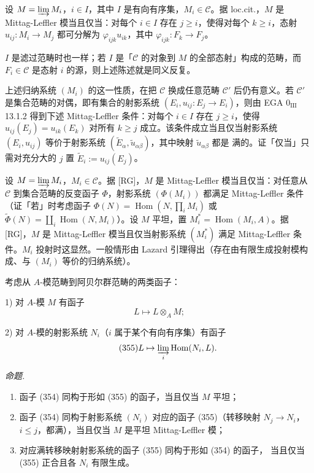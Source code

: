  设 $M=\varinjlim M_i$，$i\in I$，其中 $I$ 是有向有序集，$M_i\in\mathcal{C}$。据 loc.cit.，$M$ 是 Mittag-Leffler 模当且仅当：对每个 $i\in I$ 存在 $j\ge i$，使得对每个 $k\ge i$，态射 $u_{ij}:M_i\to M_j$ 都可分解为 $\varphi_{ijk}u_{ik}$，其中 $\varphi_{ijk}:F_k\to F_j$。

$I$ 是滤过范畴时也一样；若 $I$ 是「$\mathcal{C}$ 的对象到 $M$ 的全部态射」构成的范畴，而 $F_i\in\mathcal{C}$ 是态射 $i$ 的源，则上述陈述就是同义反复。

 上述归纳系统 $(M_i)$ 的这一性质，在把 $\mathcal{C}$ 换成任意范畴 $\mathcal{C}'$ 后仍有意义。若 $\mathcal{C}'$ 是集合范畴的对偶，即有集合的射影系统 $(E_i,u_{ij}:E_j\to E_i)$，则由 EGA $0_{\mathrm{III}}$ 13.1.2 得到下述 Mittag-Leffler 条件：对每个 $i\in I$ 存在 $j\ge i$，使得 $u_{ij}(E_j)=u_{ik}(E_k)$ 对所有 $k\ge j$ 成立。该条件成立当且仅当射影系统 $(E_i,u_{ij})$ 等价于射影系统 $(\tilde E_{\alpha},\tilde u_{\alpha\beta})$，其中映射 $\tilde u_{\alpha\beta}$ 都是%
%
满的。证「仅当」只需对充分大的 $j$ 置 $\tilde E_i:=u_{ij}(E_j)$。

 设 $M=\varinjlim M_i$，$M_i\in\mathcal{C}$。据 [RG]，$M$ 是 Mittag-Leffler 模当且仅当：对任意从 $\mathcal{C}$ 到集合范畴的反变函子 $\Phi$，射影系统 $(\Phi(M_i))$ 都满足 Mittag-Leffler 条件（证「若」时考虑函子 $\Phi(N)=\operatorname{Hom}(N,\prod_i M_i)$ 或 $\tilde\Phi(N)=\coprod_i\operatorname{Hom}(N,M_i)$）。设 $M$ 平坦，置 $M^{*}_i=\operatorname{Hom}(M_i,A)$。据 [RG]，$M$ 是 Mittag-Leffler 模当且仅当射影系统 $(M^{*}_i)$ 满足 Mittag-Leffler 条件。$M_i$ 投射时这显然。一般情形由 Lazard 引理得出（存在由有限生成投射模构成、与 $(M_i)$ 等价的归纳系统）。

 考虑从 $A$-模范畴到阿贝尔群范畴的两类函子：

1) 对 $A$-模 $M$ 有函子
\begin{equation}\tag{354}
L\mapsto L\otimes_A M;
\end{equation}

2) 对 $A$-模的射影系统 $N_i$（$i$ 属于某个有向有序集）有函子
\begin{equation}\tag{355}
L\mapsto\varinjlim_i\operatorname{Hom}(N_i,L).
\end{equation}

 \emph{命题.}
\begin{enumerate}[label=(\roman*),leftmargin=2.2em]
\item 函子 (354) 同构于形如 (355) 的函子，当且仅当 $M$ 平坦；
\item 函子 (354) 同构于射影系统 $(N_i)$ 对应的函子 (355)（转移映射 $N_j\to N_i$，$i\le j$，都满），当且仅当 $M$ 是平坦 Mittag-Leffler 模；
\item 对应满转移映射射影系统的函子 (355) 同构于形如 (354) 的函子，%
%
当且仅当 (355) 正合且各 $N_i$ 有限生成。
\end{enumerate}

